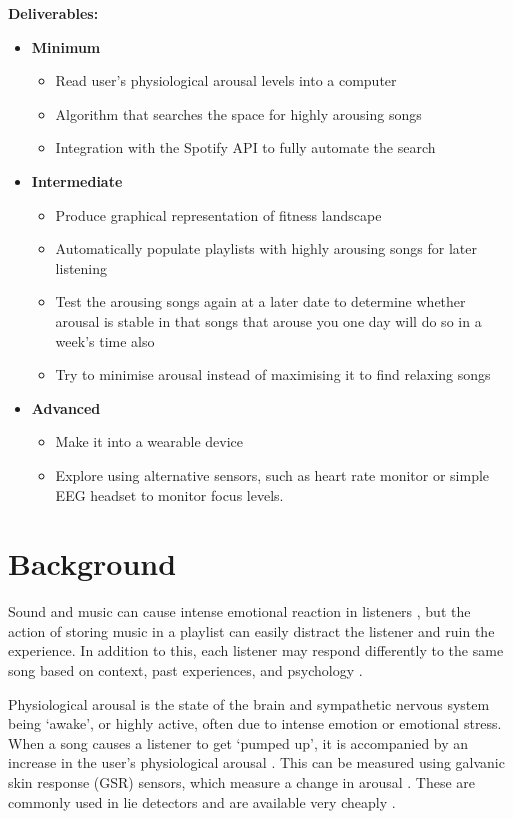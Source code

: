 \documentclass[a4paper,12pt]{article}
\begin{document}
	\textbf{Deliverables:}
	\begin{itemize}
		\item \textbf{Minimum}
		\begin{itemize}
			\item Read user's physiological arousal levels into a computer
			\item Algorithm that searches the space for highly arousing songs
			\item Integration with the Spotify API to fully automate the search
		\end{itemize}
		\item \textbf{Intermediate}
		\begin{itemize}
			\item Produce graphical representation of fitness landscape
			\item Automatically populate playlists with highly arousing songs for later listening
			\item Test the arousing songs again at a later date to determine whether arousal is stable in that songs that arouse you one day will do so in a week's time also
			\item Try to minimise arousal instead of maximising it to find relaxing songs
		\end{itemize}
		\item \textbf{Advanced}
		\begin{itemize}
			\item Make it into a wearable device
			\item Explore using alternative sensors, such as heart rate monitor or simple EEG headset to monitor focus levels.
		\end{itemize}
	\end{itemize}

	\section{Background}
	
	Sound and music can cause intense emotional reaction in listeners \citep{arousingMusic}, but the action of storing music in a playlist can easily distract the listener and ruin the experience. In addition to this, each listener may respond differently to the same song based on context, past experiences, and psychology \citep{musicDifferences}.
	
	Physiological arousal is the state of the brain and sympathetic nervous system being `awake', or highly active, often due to intense emotion or emotional stress. When a song causes a listener to get `pumped up', it is accompanied by an increase in the user's physiological arousal \citep{pumpedUp}. This can be measured using galvanic skin response (GSR) sensors, which measure a change in arousal \citep{GSR}. These are commonly used in lie detectors and are available very cheaply \citep{gsrSensor}.
	
\end{document}
